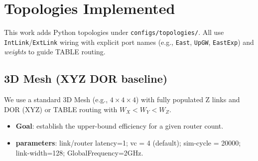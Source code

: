 \documentclass[11pt]{article}
\begin{document}
\section{Topologies Implemented}
This work adds Python topologies under \texttt{configs/topologies/}. All use \texttt{IntLink}/\texttt{ExtLink} wiring with explicit port names (e.g., \texttt{East}, \texttt{UpGW}, \texttt{EastExp}) and \emph{weights} to guide TABLE routing.

\subsection{3D Mesh (XYZ DOR baseline)}
\label{sec:mesh3d}
We use a standard 3D Mesh (e.g., $4{\times}4{\times}4$) with fully populated Z links and DOR (XYZ) or TABLE routing with $W_X < W_Y < W_Z$.
\begin{itemize}[leftmargin=1em]
  \item \textbf{Goal}: establish the upper-bound efficiency for a given router count.
  \item \textbf{parameters}: link/router latency=1; vc = 4 (default); sim-cycle = 20000; link-width=128; GlobalFrequency=2GHz.
\end{itemize}
\end{document}
